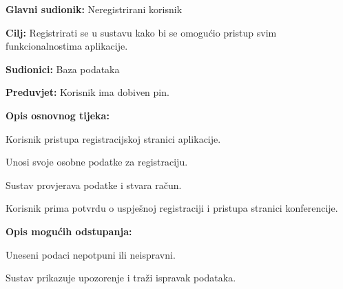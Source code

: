 					\noindent {}
					\begin{packed_item}
						
						\item \textbf{Glavni sudionik: }Neregistrirani korisnik
						\item  \textbf{Cilj:} Registrirati se u sustavu kako bi se omogućio pristup svim funkcionalnostima aplikacije.
						\item  \textbf{Sudionici:} Baza podataka
						\item  \textbf{Preduvjet:} Korisnik ima dobiven pin.
						\item  \textbf{Opis osnovnog tijeka:}
						
						\item[] \begin{packed_enum}
							
							\item Korisnik pristupa registracijskoj stranici aplikacije.
							\item Unosi svoje osobne podatke za registraciju.
							\item Sustav provjerava podatke i stvara račun.
							\item Korisnik prima potvrdu o uspješnoj registraciji i pristupa stranici konferencije.
						\end{packed_enum}
						
						\item  \textbf{Opis mogućih odstupanja:}
						
						\item[] \begin{packed_item}
							
							\item[3.a] Uneseni podaci nepotpuni ili neispravni.
							\item[] \begin{packed_enum}
								
								\item Sustav prikazuje upozorenje i traži ispravak podataka.
								
							\end{packed_enum}
						\end{packed_item}
					\end{packed_item}
					
